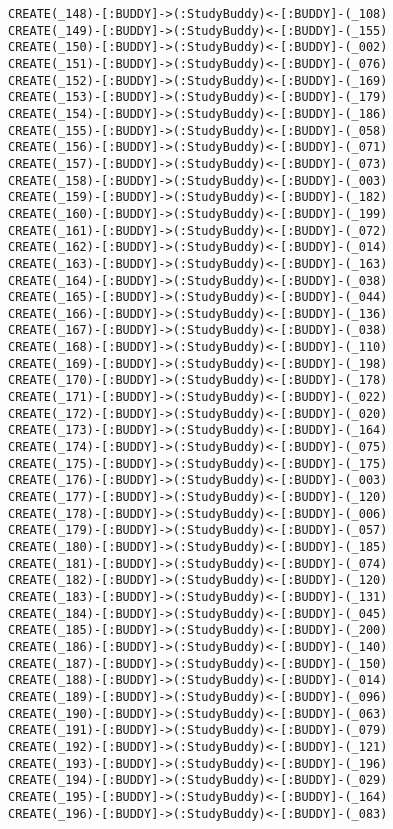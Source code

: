 \begin{lstlisting}
CREATE(_148)-[:BUDDY]->(:StudyBuddy)<-[:BUDDY]-(_108)
CREATE(_149)-[:BUDDY]->(:StudyBuddy)<-[:BUDDY]-(_155)
CREATE(_150)-[:BUDDY]->(:StudyBuddy)<-[:BUDDY]-(_002)
CREATE(_151)-[:BUDDY]->(:StudyBuddy)<-[:BUDDY]-(_076)
CREATE(_152)-[:BUDDY]->(:StudyBuddy)<-[:BUDDY]-(_169)
CREATE(_153)-[:BUDDY]->(:StudyBuddy)<-[:BUDDY]-(_179)
CREATE(_154)-[:BUDDY]->(:StudyBuddy)<-[:BUDDY]-(_186)
CREATE(_155)-[:BUDDY]->(:StudyBuddy)<-[:BUDDY]-(_058)
CREATE(_156)-[:BUDDY]->(:StudyBuddy)<-[:BUDDY]-(_071)
CREATE(_157)-[:BUDDY]->(:StudyBuddy)<-[:BUDDY]-(_073)
CREATE(_158)-[:BUDDY]->(:StudyBuddy)<-[:BUDDY]-(_003)
CREATE(_159)-[:BUDDY]->(:StudyBuddy)<-[:BUDDY]-(_182)
CREATE(_160)-[:BUDDY]->(:StudyBuddy)<-[:BUDDY]-(_199)
CREATE(_161)-[:BUDDY]->(:StudyBuddy)<-[:BUDDY]-(_072)
CREATE(_162)-[:BUDDY]->(:StudyBuddy)<-[:BUDDY]-(_014)
CREATE(_163)-[:BUDDY]->(:StudyBuddy)<-[:BUDDY]-(_163)
CREATE(_164)-[:BUDDY]->(:StudyBuddy)<-[:BUDDY]-(_038)
CREATE(_165)-[:BUDDY]->(:StudyBuddy)<-[:BUDDY]-(_044)
CREATE(_166)-[:BUDDY]->(:StudyBuddy)<-[:BUDDY]-(_136)
CREATE(_167)-[:BUDDY]->(:StudyBuddy)<-[:BUDDY]-(_038)
CREATE(_168)-[:BUDDY]->(:StudyBuddy)<-[:BUDDY]-(_110)
CREATE(_169)-[:BUDDY]->(:StudyBuddy)<-[:BUDDY]-(_198)
CREATE(_170)-[:BUDDY]->(:StudyBuddy)<-[:BUDDY]-(_178)
CREATE(_171)-[:BUDDY]->(:StudyBuddy)<-[:BUDDY]-(_022)
CREATE(_172)-[:BUDDY]->(:StudyBuddy)<-[:BUDDY]-(_020)
CREATE(_173)-[:BUDDY]->(:StudyBuddy)<-[:BUDDY]-(_164)
CREATE(_174)-[:BUDDY]->(:StudyBuddy)<-[:BUDDY]-(_075)
CREATE(_175)-[:BUDDY]->(:StudyBuddy)<-[:BUDDY]-(_175)
CREATE(_176)-[:BUDDY]->(:StudyBuddy)<-[:BUDDY]-(_003)
CREATE(_177)-[:BUDDY]->(:StudyBuddy)<-[:BUDDY]-(_120)
CREATE(_178)-[:BUDDY]->(:StudyBuddy)<-[:BUDDY]-(_006)
CREATE(_179)-[:BUDDY]->(:StudyBuddy)<-[:BUDDY]-(_057)
CREATE(_180)-[:BUDDY]->(:StudyBuddy)<-[:BUDDY]-(_185)
CREATE(_181)-[:BUDDY]->(:StudyBuddy)<-[:BUDDY]-(_074)
CREATE(_182)-[:BUDDY]->(:StudyBuddy)<-[:BUDDY]-(_120)
CREATE(_183)-[:BUDDY]->(:StudyBuddy)<-[:BUDDY]-(_131)
CREATE(_184)-[:BUDDY]->(:StudyBuddy)<-[:BUDDY]-(_045)
CREATE(_185)-[:BUDDY]->(:StudyBuddy)<-[:BUDDY]-(_200)
CREATE(_186)-[:BUDDY]->(:StudyBuddy)<-[:BUDDY]-(_140)
CREATE(_187)-[:BUDDY]->(:StudyBuddy)<-[:BUDDY]-(_150)
CREATE(_188)-[:BUDDY]->(:StudyBuddy)<-[:BUDDY]-(_014)
CREATE(_189)-[:BUDDY]->(:StudyBuddy)<-[:BUDDY]-(_096)
CREATE(_190)-[:BUDDY]->(:StudyBuddy)<-[:BUDDY]-(_063)
CREATE(_191)-[:BUDDY]->(:StudyBuddy)<-[:BUDDY]-(_079)
CREATE(_192)-[:BUDDY]->(:StudyBuddy)<-[:BUDDY]-(_121)
CREATE(_193)-[:BUDDY]->(:StudyBuddy)<-[:BUDDY]-(_196)
CREATE(_194)-[:BUDDY]->(:StudyBuddy)<-[:BUDDY]-(_029)
CREATE(_195)-[:BUDDY]->(:StudyBuddy)<-[:BUDDY]-(_164)
CREATE(_196)-[:BUDDY]->(:StudyBuddy)<-[:BUDDY]-(_083)

\end{lstlisting}
